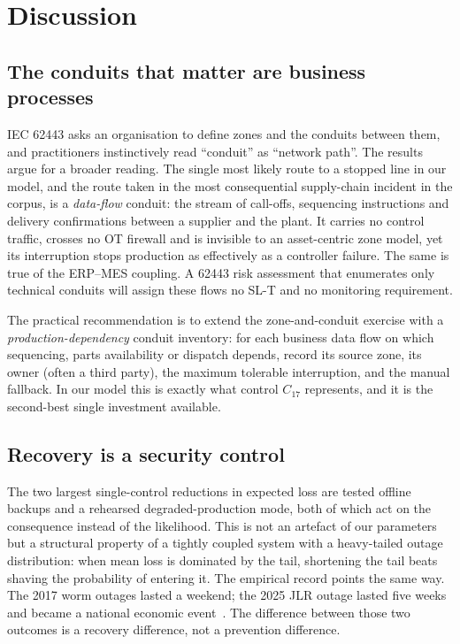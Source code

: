 


\section{Discussion}
\label{sec:discussion}

\subsection{The conduits that matter are business processes}

IEC 62443 asks an organisation to define zones and the conduits between them,
and practitioners instinctively read ``conduit'' as ``network path''. The
results argue for a broader reading. The single most likely route to a stopped
line in our model, and the route taken in the most consequential supply-chain
incident in the corpus, is a \emph{data-flow} conduit: the stream of call-offs,
sequencing instructions and delivery confirmations between a supplier and the
plant. It carries no control traffic, crosses no OT firewall and is invisible
to an asset-centric zone model, yet its interruption stops production as
effectively as a controller failure. The same is true of the ERP--MES coupling.
A 62443 risk assessment that enumerates only technical conduits will assign
these flows no SL-T and no monitoring requirement.

The practical recommendation is to extend the zone-and-conduit exercise with a
\emph{production-dependency} conduit inventory: for each business data flow on
which sequencing, parts availability or dispatch depends, record its source
zone, its owner (often a third party), the maximum tolerable interruption, and
the manual fallback. In our model this is exactly what control $C_{17}$
represents, and it is the second-best single investment available.

\subsection{Recovery is a security control}

The two largest single-control reductions in expected loss are tested offline
backups and a rehearsed degraded-production mode, both of which act on the
consequence instead of the likelihood. This is not an artefact of our parameters but a
structural property of a tightly coupled system with a heavy-tailed outage
distribution: when mean loss is dominated by the tail, shortening the tail
beats shaving the probability of entering it. The empirical record points the
same way. The 2017 worm outages lasted a weekend; the 2025 JLR outage lasted
five weeks and became a national economic event~\cite{inc18cmc}. The difference
between those two outcomes is a recovery difference, not a prevention
difference.

